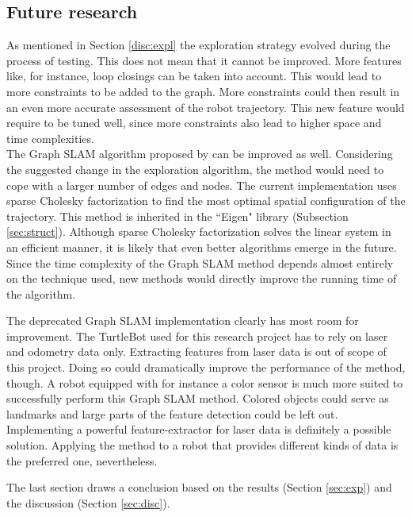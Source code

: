 \documentclass{ba-kecs}
\begin{document}
\subsection{Future research}
\label{sec:future}
As mentioned in Section \ref{disc:expl} the exploration strategy evolved during the process of testing. This does not mean that it cannot be improved. More features like, for instance, loop closings can be taken into account. This would lead to more constraints to be added to the graph. More constraints could then result in an even more accurate assessment of the robot trajectory. This new feature would require to be tuned well, since more constraints also lead to higher space and time complexities. 
\\

The Graph SLAM algorithm proposed by \citep{Grisetti} can be improved as well. Considering the suggested change in the exploration algorithm, the method would need to cope with a larger number of edges and nodes.
The current implementation uses sparse Cholesky factorization to find the most optimal spatial configuration of the trajectory. This method is inherited in the ``Eigen" library (Subsection \ref{sec:struct}). Although sparse Cholesky factorization solves the linear system in an efficient manner, it is likely that even better algorithms emerge in the future. Since the time complexity of the Graph SLAM method depends almost entirely on the technique used, new methods would directly improve the running time of the algorithm.

The deprecated Graph SLAM implementation clearly has most room for improvement. The TurtleBot used for this research project has to rely on laser and odometry data only. Extracting features from laser data is out of scope of this project. Doing so could dramatically improve the performance of the method, though. 
A robot equipped with for instance a color sensor is much more suited to successfully perform this Graph SLAM method. Colored objects could serve as landmarks and large parts of the feature detection could be left out. Implementing a powerful feature-extractor for laser data is definitely a possible solution. Applying the method to a robot that provides different kinds of data is the preferred one, nevertheless.

The last section draws a conclusion based on the results (Section \ref{sec:exp}) and the discussion (Section \ref{sec:disc}).
\end{document}
